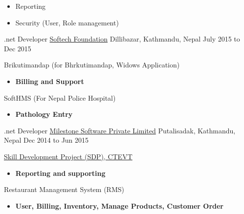 \begin{cventries}
{\begin{cvitems}
		\begin{itemize}
			\item {Reporting}
			\item {Security (User, Role management)}
		\end{itemize}
	\end{cvitems}
}
  \cventry
    {.net Developer} %
    {\href{http://softechfoundation.com/}{Softech Foundation}} %
    {Dillibazar, Kathmandu, Nepal} %
    {July 2015 to Dec 2015} %
    {
    	\begin{cvitems} %
    		\item {Brikutimandap (for Bhrkutimandap, Widows Application)}
    		\begin{itemize}
    			\item {\textbf{Billing and Support}}
    		\end{itemize}
    		\item {SoftHMS (For Nepal Police Hospital)}
    		\begin{itemize}
    			\item {\textbf{Pathology Entry}}
    		\end{itemize}
    	\end{cvitems}
    }
 
  \cventry
    {.net Developer} %
    {\href{http://milestonesoftware.com.np/}{Milestone Software Private Limited}} %
    {Putalisadak, Kathmandu, Nepal} %
    {Dec 2014 to Jun 2015} %
    {
      \begin{cvitems} %
        \item {\href{http://202.45.144.216/}{Skill Development Project (SDP), CTEVT}}
        \begin{itemize}
        \item {\textbf{Reporting and supporting}}
        \end{itemize}
        \item {Restaurant Management System (RMS)}
        \begin{itemize}
        \item {\textbf{User, Billing, Inventory, Manage Products, Customer Order}}
        \end{itemize}
      \end{cvitems}
    }


\end{cventries}
